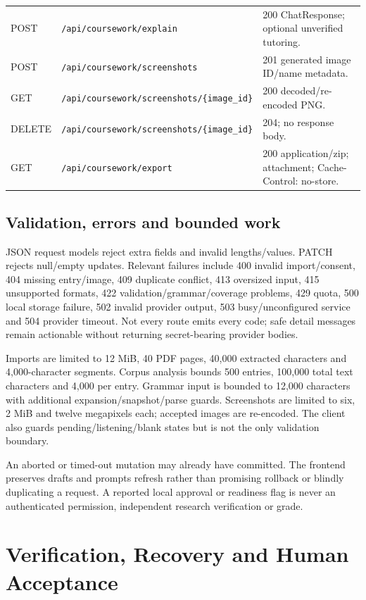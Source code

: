 \documentclass[11pt,a4paper]{article}
\begin{document}
\begin{longtable}{L{1.6cm}L{6.6cm}L{6.4cm}}
POST & \nolinkurl{/api/coursework/explain} & 200 ChatResponse; optional unverified tutoring.\\
POST & \nolinkurl{/api/coursework/screenshots} & 201 generated image ID/name metadata.\\
GET & \nolinkurl{/api/coursework/screenshots/{image_id}} & 200 decoded/re-encoded PNG.\\
DELETE & \nolinkurl{/api/coursework/screenshots/{image_id}} & 204; no response body.\\
GET & \nolinkurl{/api/coursework/export} & 200 application/zip; attachment; Cache-Control: no-store.\\
\bottomrule\end{longtable}\endgroup

\subsection{Validation, errors and bounded work}
JSON request models reject extra fields and invalid lengths/values. PATCH
rejects null/empty updates. Relevant failures include 400 invalid import/consent,
404 missing entry/image, 409 duplicate conflict, 413 oversized input, 415
unsupported formats, 422 validation/grammar/coverage problems, 429 quota,
500 local storage failure, 502 invalid provider output, 503 busy/unconfigured
service and 504 provider timeout. Not every route emits every code; safe detail
messages remain actionable without returning secret-bearing provider bodies.

Imports are limited to 12 MiB, 40 PDF pages, 40,000 extracted characters and
4,000-character segments. Corpus analysis bounds 500 entries, 100,000 total
text characters and 4,000 per entry. Grammar input is bounded to 12,000
characters with additional expansion/snapshot/parse guards. Screenshots are
limited to six, 2 MiB and twelve megapixels each; accepted images are re-encoded.
The client also guards pending/listening/blank states but is not the only
validation boundary.

An aborted or timed-out mutation may already have committed. The frontend
preserves drafts and prompts refresh rather than promising rollback or blindly
duplicating a request. A reported local approval or readiness flag is never an
authenticated permission, independent research verification or grade.

\section{Verification, Recovery and Human Acceptance}
\end{document}
